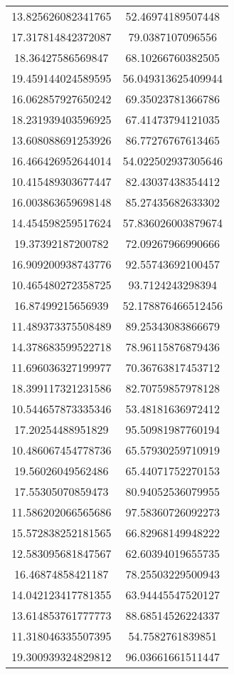 \begin{table}
\begin{tabular}{cc}
13.825626082341765 & 52.46974189507448 \\
17.317814842372087 & 79.0387107096556 \\
18.36427586569847 & 68.10266760382505 \\
19.459144024589595 & 56.049313625409944 \\
16.062857927650242 & 69.35023781366786 \\
18.231939403596925 & 67.41473794121035 \\
13.608088691253926 & 86.77276767613465 \\
16.466426952644014 & 54.022502937305646 \\
10.415489303677447 & 82.43037438354412 \\
16.003863659698148 & 85.27435682633302 \\
14.454598259517624 & 57.836026003879674 \\
19.37392187200782 & 72.09267966990666 \\
16.909200938743776 & 92.55743692100457 \\
10.465480272358725 & 93.7124243298394 \\
16.87499215656939 & 52.178876466512456 \\
11.489373375508489 & 89.25343083866679 \\
14.378683599522718 & 78.96115876879436 \\
11.696036327199977 & 70.36763817453712 \\
18.399117321231586 & 82.70759857978128 \\
10.544657873335346 & 53.48181636972412 \\
17.20254488951829 & 95.50981987760194 \\
10.486067454778736 & 65.57930259710919 \\
19.56026049562486 & 65.44071752270153 \\
17.55305070859473 & 80.94052536079955 \\
11.586202066565686 & 97.58360726092273 \\
15.572838252181565 & 66.82968149948222 \\
12.583095681847567 & 62.60394019655735 \\
16.46874858421187 & 78.25503229500943 \\
14.042123417781355 & 63.94445547520127 \\
13.614853761777773 & 88.68514526224337 \\
11.318046335507395 & 54.7582761839851 \\
19.300939324829812 & 96.03661661511447 \\

\end{tabular}
\end{table}

